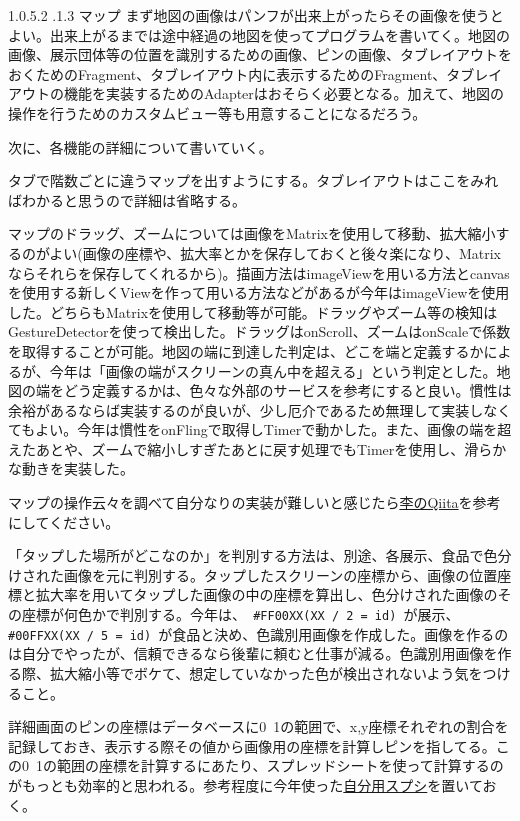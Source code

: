 \documentclass[dvipdfmx,jb5]{jarticle}
\makeatletter
\newcommand{\subsubsubsection}{\@startsection{paragraph}{4}{\z@}%
    {1.0\Cvs \@plus.5\Cdp \@minus.2\Cdp}%
    {.1\Cvs \@plus.3\Cdp}%
    {\reset@font}
  }
\newcommand{\link}[2]{\href{#2}{#1}}
\makeatother
\begin{document}
 \subsubsubsection{マップ}
 まず地図の画像はパンフが出来上がったらその画像を使うとよい。出来上がるまでは途中経過の地図を使ってプログラムを書いてく。地図の画像、展示団体等の位置を識別するための画像、ピンの画像、タブレイアウトをおくためのFragment、タブレイアウト内に表示するためのFragment、タブレイアウトの機能を実装するためのAdapterはおそらく必要となる。加えて、地図の操作を行うためのカスタムビュー等も用意することになるだろう。\par
 次に、各機能の詳細について書いていく。\par
 タブで階数ごとに違うマップを出すようにする。タブレイアウトはここをみればわかると思うので詳細は省略する。\par
マップのドラッグ、ズームについては画像をMatrixを使用して移動、拡大縮小するのがよい(画像の座標や、拡大率とかを保存しておくと後々楽になり、Matrixならそれらを保存してくれるから)。描画方法はimageViewを用いる方法とcanvasを使用する新しくViewを作って用いる方法などがあるが今年はimageViewを使用した。どちらもMatrixを使用して移動等が可能。ドラッグやズーム等の検知はGestureDetectorを使って検出した。ドラッグはonScroll、ズームはonScaleで係数を取得することが可能。地図の端に到達した判定は、どこを端と定義するかによるが、今年は「画像の端がスクリーンの真ん中を超える」という判定とした。地図の端をどう定義するかは、色々な外部のサービスを参考にすると良い。慣性は余裕があるならば実装するのが良いが、少し厄介であるため無理して実装しなくてもよい。今年は慣性をonFlingで取得しTimerで動かした。また、画像の端を超えたあとや、ズームで縮小しすぎたあとに戻す処理でもTimerを使用し、滑らかな動きを実装した。\par
マップの操作云々を調べて自分なりの実装が難しいと感じたら\link{李のQiita}{https://qiita.com/Cyber_Hacnosuke/items/b2a8724218d2f4a4c3c2}を参考にしてください。\par
「タップした場所がどこなのか」を判別する方法は、別途、各展示、食品で色分けされた画像を元に判別する。タップしたスクリーンの座標から、画像の位置座標と拡大率を用いてタップした画像の中の座標を算出し、色分けされた画像のその座標が何色かで判別する。今年は、\verb+ #FF00XX(XX / 2 = id) +が展示、\verb+ #00FFXX(XX / 5 = id) +が食品と決め、色識別用画像を作成した。画像を作るのは自分でやったが、信頼できるなら後輩に頼むと仕事が減る。色識別用画像を作る際、拡大縮小等でボケて、想定していなかった色が検出されないよう気をつけること。\par
詳細画面のピンの座標はデータベースに0~1の範囲で、x,y座標それぞれの割合を記録しておき、表示する際その値から画像用の座標を計算しピンを指してる。この0~1の範囲の座標を計算するにあたり、スプレッドシートを使って計算するのがもっとも効率的と思われる。参考程度に今年使った\link{自分用スプシ}{https://bit.ly/3cm73ig}を置いておく。\par
\end{document}
